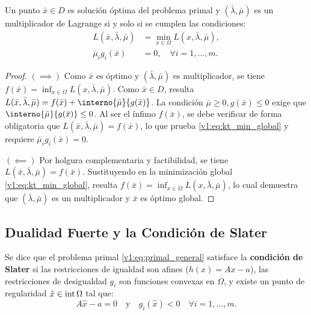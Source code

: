 \begin{theorem}\label{v1:thm:kuhn_tucker_non_diff}
    Un punto $\bar{x} \in D$ es solución óptima del problema primal y $(\bar{\lambda}, \bar{\mu})$ es un multiplicador de Lagrange si y solo si se cumplen las condiciones:
    \begin{align}
        L(\bar{x}, \bar{\lambda}, \bar{\mu}) & = \min_{x \in \Omega} L(x, \bar{\lambda}, \bar{\mu}), \label{v1:eq:kt_min_global} \\
        \bar{\mu}_i g_i(\bar{x})             & = 0, \quad \forall i = 1, \dots, m. \label{v1:eq:kt_complementarity_non_diff}
    \end{align}
\end{theorem}

\begin{proof}
    \( (\implies) \) Como $\bar{x}$ es óptimo y $(\bar{\lambda}, \bar{\mu})$ es multiplicador, se tiene $f(\bar{x}) = \inf_{x \in \Omega} L(x, \bar{\lambda}, \bar{\mu})$. Como $\bar{x} \in D$, resulta $L(\bar{x}, \bar{\lambda}, \bar{\mu}) = f(\bar{x}) + \interno{\bar{\mu}}{g(\bar{x})}$. La condición $\bar{\mu} \ge 0, g(\bar{x}) \le 0$ exige que $\interno{\bar{\mu}}{g(\bar{x})} \le 0$. Al ser el ínfimo $f(\bar{x})$, se debe verificar de forma obligatoria que $L(\bar{x}, \bar{\lambda}, \bar{\mu}) = f(\bar{x})$, lo que prueba \eqref{v1:eq:kt_min_global} y requiere $\bar{\mu}_i g_i(\bar{x}) = 0$.
    
    \( (\impliedby) \) Por holgura complementaria y factibilidad, se tiene $L(\bar{x}, \bar{\lambda}, \bar{\mu}) = f(\bar{x})$. Sustituyendo en la minimización global \eqref{v1:eq:kt_min_global}, resulta $f(\bar{x}) = \inf_{x \in \Omega} L(x, \bar{\lambda}, \bar{\mu})$, lo cual demuestra que $(\bar{\lambda}, \bar{\mu})$ es un multiplicador y $\bar{x}$ es óptimo global.
\end{proof}

\subsection{Dualidad Fuerte y la Condición de Slater}

\begin{definition}\label{v1:def:slater}
    Se dice que el problema primal \eqref{v1:eq:primal_general} satisface la \textbf{condición de Slater} si las restricciones de igualdad son afines ($h(x) = Ax - a$), las restricciones de desigualdad $g_i$ son funciones convexas en $\Omega$, y existe un punto de regularidad $\hat{x} \in \operatorname{\operatorname{int}} \Omega$ tal que:
    \begin{equation}
        A\hat{x} - a = 0 \quad \text{y} \quad g_i(\hat{x}) < 0 \quad \forall i = 1, \dots, m.
    \end{equation}
\end{definition}


